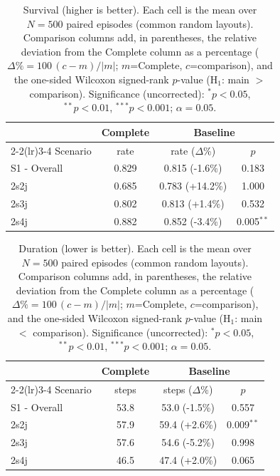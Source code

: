 \begin{table}[ht]
  \centering
  \caption{Survival (higher is better). Each cell is the mean over $N=500$ paired episodes (common random layouts). Comparison columns add, in parentheses, the relative deviation from the Complete column as a percentage ($\Delta\%=100\,(c-m)/|m|$; $m$=Complete, $c$=comparison), and the one-sided Wilcoxon signed-rank $p$-value (H$_1$: main $>$ comparison). Significance (uncorrected): $^{*}p<0.05$, $^{**}p<0.01$, $^{***}p<0.001$; $\alpha=0.05$.}
  \label{tab:wilcoxon-survival}
  \small
  \begin{tabular}{l c cc}
    \toprule
     & Complete & \multicolumn{2}{c}{Baseline} \\
    \cmidrule(lr){2-2}\cmidrule(lr){3-4}
    Scenario & {rate} & {rate ($\Delta$\%)} & {$p$} \\
    \midrule
    S1 - Overall & 0.829 & 0.815 (-1.6\%) & 0.183 \\
    2s2j & 0.685 & 0.783 (+14.2\%) & 1.000 \\
    2s3j & 0.802 & 0.813 (+1.4\%) & 0.532 \\
    2s4j & 0.882 & 0.852 (-3.4\%) & 0.005$^{**}$ \\
    \bottomrule
  \end{tabular}
\end{table}

\begin{table}[ht]
  \centering
  \caption{Duration (lower is better). Each cell is the mean over $N=500$ paired episodes (common random layouts). Comparison columns add, in parentheses, the relative deviation from the Complete column as a percentage ($\Delta\%=100\,(c-m)/|m|$; $m$=Complete, $c$=comparison), and the one-sided Wilcoxon signed-rank $p$-value (H$_1$: main $<$ comparison). Significance (uncorrected): $^{*}p<0.05$, $^{**}p<0.01$, $^{***}p<0.001$; $\alpha=0.05$.}
  \label{tab:wilcoxon-duration}
  \small
  \begin{tabular}{l c cc}
    \toprule
     & Complete & \multicolumn{2}{c}{Baseline} \\
    \cmidrule(lr){2-2}\cmidrule(lr){3-4}
    Scenario & {steps} & {steps ($\Delta$\%)} & {$p$} \\
    \midrule
    S1 - Overall & 53.8 & 53.0 (-1.5\%) & 0.557 \\
    2s2j & 57.9 & 59.4 (+2.6\%) & 0.009$^{**}$ \\
    2s3j & 57.6 & 54.6 (-5.2\%) & 0.998 \\
    2s4j & 46.5 & 47.4 (+2.0\%) & 0.065 \\
    \bottomrule
  \end{tabular}
\end{table}

